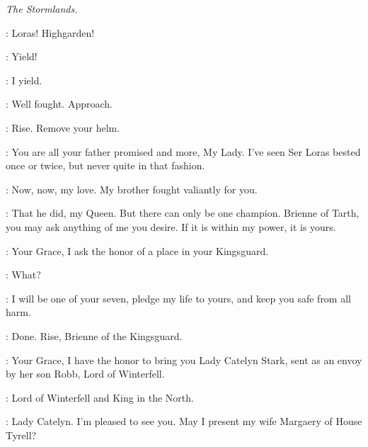 \scene

\textit{The Stormlands.} 


\MARGAERY: Loras! Highgarden! 


\BRIENNE: Yield! 

\LORAS: I yield. 


\RENLY: Well fought. Approach. 


\RENLY: Rise. Remove your helm. 


\RENLY: You are all your father promised and more, My Lady. I've seen Ser Loras bested once or twice, but never quite in that fashion. 

\MARGAERY: Now, now, my love. My brother fought valiantly for you. 

\RENLY: That he did, my Queen. But there can only be one champion. Brienne of Tarth, you may ask anything of me you desire. If it is within my power, it is yours. 

\BRIENNE: Your Grace, I ask the honor of a place in your Kingsguard. 


\LORAS: What? 

\BRIENNE: I will be one of your seven, pledge my life to yours, and keep you safe from all harm. 

\RENLY: Done. Rise, Brienne of the Kingsguard. 


\COLEN: Your Grace, I have the honor to bring you Lady Catelyn Stark, sent as an envoy by her son Robb, Lord of Winterfell. 

\CATELYN: Lord of Winterfell and King in the North. 

\RENLY: Lady Catelyn. I'm pleased to see you. May I present my wife Margaery of House Tyrell? 

